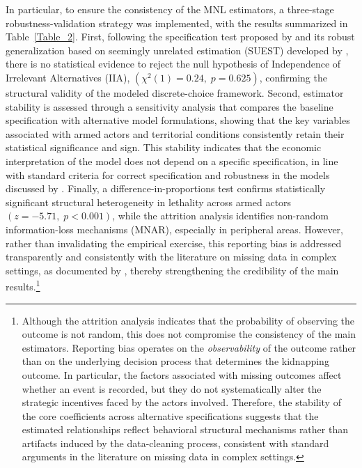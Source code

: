\documentclass[12pt,a4paper]{article}
\providecommand{\textcite}{\citet}
\theoremstyle{plain}
\theoremstyle{definition}
\theoremstyle{remark}
\newcommand{\1}{\mathbf{1}}
\begin{document}
In particular, to ensure the consistency of the MNL estimators, a three-stage robustness-validation strategy was implemented, with the results summarized in Table~\ref{Table_2}. First, following the specification test proposed by \textcite{HausmanMcFadden1984} and its robust generalization based on seemingly unrelated estimation (SUEST) developed by \textcite{Weesie1999}, there is no statistical evidence to reject the null hypothesis of Independence of Irrelevant Alternatives (IIA), \((\chi^2(1)=0.24,\; p=0.625)\), confirming the structural validity of the modeled discrete-choice framework. Second, estimator stability is assessed through a sensitivity analysis that compares the baseline specification with alternative model formulations, showing that the key variables associated with armed actors and territorial conditions consistently retain their statistical significance and sign. This stability indicates that the economic interpretation of the model does not depend on a specific specification, in line with standard criteria for correct specification and robustness in the models discussed by \textcite{Wooldridge2010}. Finally, a difference-in-proportions test confirms statistically significant structural heterogeneity in lethality across armed actors \((z=-5.71,\; p<0.001)\), while the attrition analysis identifies non-random information-loss mechanisms (MNAR), especially in peripheral areas. However, rather than invalidating the empirical exercise, this reporting bias is addressed transparently and consistently with the literature on missing data in complex settings, as documented by \textcite{LittleRubin2020}, thereby strengthening the credibility of the main results.\footnote{Although the attrition analysis indicates that the probability of observing the outcome is not random, this does not compromise the consistency of the main estimators. Reporting bias operates on the \emph{observability} of the outcome rather than on the underlying decision process that determines the kidnapping outcome. In particular, the factors associated with missing outcomes affect whether an event is recorded, but they do not systematically alter the strategic incentives faced by the actors involved. Therefore, the stability of the core coefficients across alternative specifications suggests that the estimated relationships reflect behavioral structural mechanisms rather than artifacts induced by the data-cleaning process, consistent with standard arguments in the literature on missing data in complex settings.}
\end{document}

